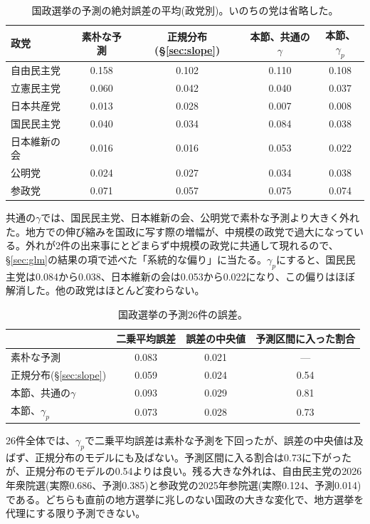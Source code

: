 \documentclass[a4paper,11pt]{ltjsarticle}
\begin{document}
\begin{table}[h]
\centering
\begin{tabular}{lcccc}
\hline
政党 & 素朴な予測 & 正規分布(\S\ref{sec:slope}) & 本節、共通の$\gamma$ & 本節、$\gamma_p$ \\
\hline
自由民主党 & 0.158 & 0.102 & 0.110 & 0.108 \\
立憲民主党 & 0.060 & 0.042 & 0.040 & 0.037 \\
日本共産党 & 0.013 & 0.028 & 0.007 & 0.008 \\
国民民主党 & 0.040 & 0.034 & 0.084 & 0.038 \\
日本維新の会 & 0.016 & 0.016 & 0.053 & 0.022 \\
公明党 & 0.024 & 0.027 & 0.034 & 0.038 \\
参政党 & 0.071 & 0.057 & 0.075 & 0.074 \\
\hline
\end{tabular}
\caption{国政選挙の予測の絶対誤差の平均(政党別)。いのちの党は省略した。}
\end{table}

共通の$\gamma$では、国民民主党、日本維新の会、公明党で素朴な予測より大きく外れた。地方での伸び縮みを国政に写す際の増幅が、中規模の政党で過大になっている。外れが2件の出来事にとどまらず中規模の政党に共通して現れるので、\S\ref{sec:glm}の結果の項で述べた「系統的な偏り」に当たる。$\gamma_p$にすると、国民民主党は0.084から0.038、日本維新の会は0.053から0.022になり、この偏りはほぼ解消した。他の政党はほとんど変わらない。

\begin{table}[h]
\centering
\begin{tabular}{lccc}
\hline
 & 二乗平均誤差 & 誤差の中央値 & 予測区間に入った割合 \\
\hline
素朴な予測 & 0.083 & 0.021 & --- \\
正規分布(\S\ref{sec:slope}) & 0.059 & 0.024 & 0.54 \\
本節、共通の$\gamma$ & 0.093 & 0.029 & 0.81 \\
本節、$\gamma_p$ & 0.073 & 0.028 & 0.73 \\
\hline
\end{tabular}
\caption{国政選挙の予測26件の誤差。}
\end{table}

26件全体では、$\gamma_p$で二乗平均誤差は素朴な予測を下回ったが、誤差の中央値は及ばず、正規分布のモデルにも及ばない。予測区間に入る割合は0.73に下がったが、正規分布のモデルの0.54よりは良い。残る大きな外れは、自由民主党の2026年衆院選(実際0.686、予測0.385)と参政党の2025年参院選(実際0.124、予測0.014)である。どちらも直前の地方選挙に兆しのない国政の大きな変化で、地方選挙を代理にする限り予測できない。
\end{document}
